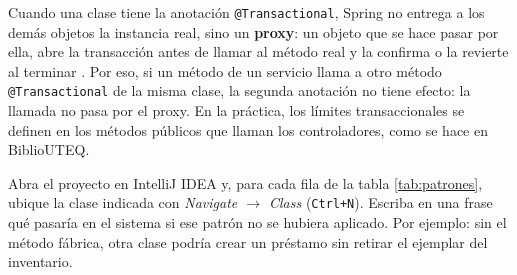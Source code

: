 Cuando una clase tiene la anotación \texttt{@Transactional}, Spring no entrega a los demás objetos la instancia real, sino un \textbf{proxy}: un objeto que se hace pasar por ella, abre la transacción antes de llamar al método real y la confirma o la revierte al terminar \cite{gamma1994design}. Por eso, si un método de un servicio llama a otro método \texttt{@Transactional} de la misma clase, la segunda anotación no tiene efecto: la llamada no pasa por el proxy. En la práctica, los límites transaccionales se definen en los métodos públicos que llaman los controladores, como se hace en BiblioUTEQ.

\begin{practicaBox}[title={Práctica 2.1: reconocer patrones}]
	Abra el proyecto en IntelliJ IDEA y, para cada fila de la tabla \ref{tab:patrones}, ubique la clase indicada con \emph{Navigate $\rightarrow$ Class} (\texttt{Ctrl+N}). Escriba en una frase qué pasaría en el sistema si ese patrón no se hubiera aplicado. Por ejemplo: sin el método fábrica, otra clase podría crear un préstamo sin retirar el ejemplar del inventario.
\end{practicaBox}
